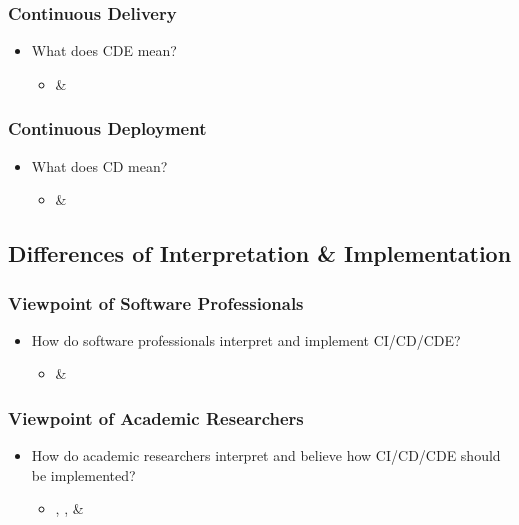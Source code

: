 \documentclass[11pt,a4paper]{article}
\begin{document}
		\subsubsection{Continuous Delivery}
		\begin{itemize}[noitemsep]
			\item What does CDE mean?
			\begin{itemize}
				\item \cite{shahin_babar_zhu_2017} \& \cite{stackify_2018}
			\end{itemize}
		\end{itemize}
		\subsubsection{Continuous Deployment}
		\begin{itemize}[noitemsep]
			\item What does CD mean?
			\begin{itemize}
				\item \cite{shahin_babar_zhu_2017} \& \cite{stackify_2018}
			\end{itemize}
		\end{itemize}
		
	\subsection{Differences of Interpretation \& Implementation}
		\subsubsection{Viewpoint of Software Professionals}
		\begin{itemize}[noitemsep]
			\item How do software professionals interpret and implement CI/CD/CDE?
			\begin{itemize}
				\item \cite{atkinson_edwards_2018} \& \cite{stackify_2018}
			\end{itemize}
		\end{itemize}
		\subsubsection{Viewpoint of Academic Researchers}
		\begin{itemize}[noitemsep]
			\item How do academic researchers interpret and believe how CI/CD/CDE should be implemented?
			\begin{itemize}
				\item \cite{bosch_2014}, \cite{shahin_babar_zhu_2017}, \& \cite{stahl_2017}
			\end{itemize}
		\end{itemize}
\end{document}

